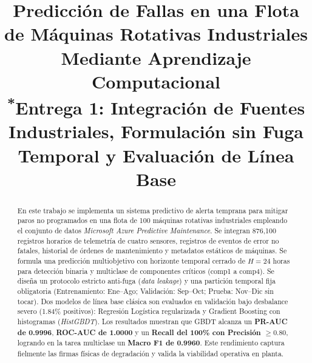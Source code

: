 \documentclass[conference]{IEEEtran}
\begin{document}
\title{Predicción de Fallas en una Flota de Máquinas Rotativas Industriales Mediante Aprendizaje Computacional\\
{\footnotesize \textsuperscript{*}Entrega 1: Integración de Fuentes Industriales, Formulación sin Fuga Temporal y Evaluación de Línea Base}}

\author{
\and
{}
\and
{}
}

\maketitle

\begin{abstract}
En este trabajo se implementa un sistema predictivo de alerta temprana para mitigar paros no programados en una flota de 100 máquinas rotativas industriales empleando el conjunto de datos \textit{Microsoft Azure Predictive Maintenance}. Se integran 876,100 registros horarios de telemetría de cuatro sensores, registros de eventos de error no fatales, historial de órdenes de mantenimiento y metadatos estáticos de máquinas. Se formula una predicción multiobjetivo con horizonte temporal cerrado de $H = 24$ horas para detección binaria y multiclase de componentes críticos (comp1 a comp4). Se diseña un protocolo estricto anti-fuga (\textit{data leakage}) y una partición temporal fija obligatoria (Entrenamiento: Ene--Ago; Validación: Sep--Oct; Prueba: Nov--Dic sin tocar). Dos modelos de línea base clásica son evaluados en validación bajo desbalance severo (1.84\% positivos): Regresión Logística regularizada y Gradient Boosting con histogramas (\textit{HistGBDT}). Los resultados muestran que GBDT alcanza un \textbf{PR-AUC de 0.9996}, \textbf{ROC-AUC de 1.0000} y un \textbf{Recall del 100\% con Precisión $\ge 0.80$}, logrando en la tarea multiclase un \textbf{Macro F1 de 0.9960}. Este rendimiento captura fielmente las firmas físicas de degradación y valida la viabilidad operativa en planta.
\end{abstract}
\end{document}
